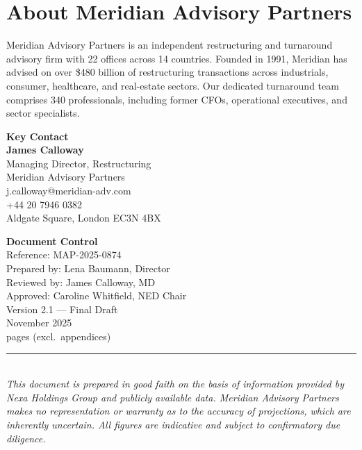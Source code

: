 \documentclass[11pt,a4paper]{article}
\begin{document}
\vspace{14pt}

\section{About Meridian Advisory Partners}

Meridian Advisory Partners is an independent restructuring and turnaround advisory firm
with 22 offices across 14 countries. Founded in 1991, Meridian has advised on over
\$480 billion of restructuring transactions across industrials, consumer, healthcare,
and real-estate sectors. Our dedicated turnaround team comprises 340 professionals,
including former CFOs, operational executives, and sector specialists.

\vspace{6pt}
\noindent
\begin{minipage}[t]{0.48\textwidth}
  \begin{tcolorbox}[goldbox]
  \footnotesize
  \textbf{Key Contact}\\[4pt]
  \textbf{James Calloway}\\
  Managing Director, Restructuring\\
  Meridian Advisory Partners\\[3pt]
  \faEnvelope\enspace j.calloway@meridian-adv.com\\
  \faPhone\enspace +44 20 7946 0382\\
  \faMapMarker{} Aldgate Square, London EC3N 4BX
  \end{tcolorbox}
\end{minipage}\hfill
\begin{minipage}[t]{0.48\textwidth}
  \begin{tcolorbox}[goldbox]
  \footnotesize
  \textbf{Document Control}\\[4pt]
  Reference: MAP-2025-0874\\
  Prepared by: Lena Baumann, Director\\
  Reviewed by: James Calloway, MD\\
  Approved: Caroline Whitfield, NED Chair\\[3pt]
  \faPen\enspace Version 2.1 — Final Draft\\
  \faCalendar{} November 2025\\
  \faFile{} pages (excl.\ appendices)
  \end{tcolorbox}
\end{minipage}

\vspace{16pt}

\begin{center}
  \textcolor{LightRule}{\rule{0.5\linewidth}{0.4pt}}\\[6pt]
  \textcolor{MidGray}{\footnotesize
    \textit{This document is prepared in good faith on the basis of information provided by Nexa
    Holdings Group and publicly available data. Meridian Advisory Partners makes no representation
    or warranty as to the accuracy of projections, which are inherently uncertain. All figures
    are indicative and subject to confirmatory due diligence.}}
\end{center}
\end{document}

